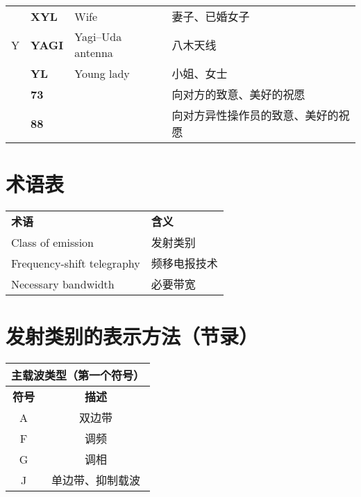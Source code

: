 \begin{longtable}[l]{llll}
    & \textbf{XYL}                      & Wife                                    & 妻子、已婚女子             \\
  Y & \textbf{YAGI}                     & Yagi–Uda antenna                        & 八木天线                \\
    & \textbf{YL}                       & Young lady                              & 小姐、女士               \\
    & \textbf{73}                       &                                         & 向对方的致意、美好的祝愿        \\
    & \textbf{88}                       &                                         & 向对方异性操作员的致意、美好的祝愿   \\
\end{longtable}

\newpage

\section{术语表}

\begin{longtable}[l]{ll}
  \textbf{术语}                & \textbf{含义} \\
  Class of emission          & 发射类别        \\
  Frequency-shift telegraphy & 频移电报技术      \\
  Necessary bandwidth        & 必要带宽        \\
\end{longtable}

\newpage

\section{发射类别的表示方法（节录）}

\begin{tabular}{|c|c|}
  \hline
  \multicolumn{2}{|c|}{\textbf{主载波类型（第一个符号）}} \\
  \hline
  \textbf{符号} & \textbf{描述}                   \\
  \hline
  A           & 双边带                           \\
  \hline
  F           & 调频                            \\
  \hline
  G           & 调相                            \\
  \hline
  J           & 单边带、抑制载波                      \\
  \hline
\end{tabular}


